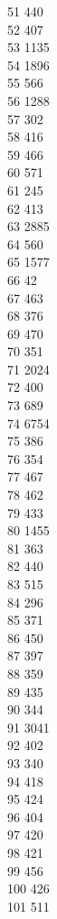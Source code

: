 { 51	440 \\
 52	407 \\
 53	1135 \\
 54	1896 \\
 55	566 \\
 56	1288 \\
 57	302 \\
 58	416 \\
 59	466 \\
 60	571 \\
 61	245 \\
 62	413 \\
 63	2885 \\
 64	560 \\
 65	1577 \\
 66	42 \\
 67	463 \\
 68	376 \\
 69	470 \\
 70	351 \\
 71	2024 \\
 72	400 \\
 73	689 \\
 74	6754 \\
 75	386 \\
 76	354 \\
 77	467 \\
 78	462 \\
 79	433 \\
 80	1455 \\
 81	363 \\
 82	440 \\
 83	515 \\
 84	296 \\
 85	371 \\
 86	450 \\
 87	397 \\
 88	359 \\
 89	435 \\
 90	344 \\
 91	3041 \\
 92	402 \\
 93	340 \\
 94	418 \\
 95	424 \\
 96	404 \\
 97	420 \\
 98	421 \\
 99	456 \\
 100	426 \\
 101	511 \\
}
